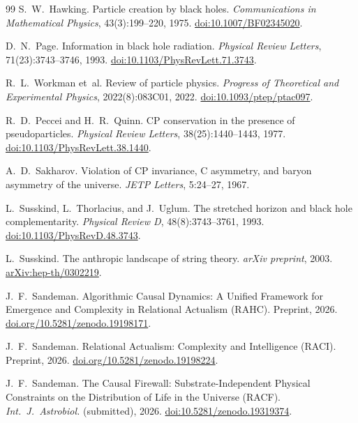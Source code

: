 \documentclass[11pt,a4paper]{article}
\begin{document}
\begin{thebibliography}{99}
S.~W.~Hawking.
\newblock Particle creation by black holes.
\newblock \emph{Communications in Mathematical Physics}, 43(3):199--220, 1975.
\newblock \href{https://doi.org/10.1007/BF02345020}{doi:10.1007/BF02345020}.

D.~N.~Page.
\newblock Information in black hole radiation.
\newblock \emph{Physical Review Letters}, 71(23):3743--3746, 1993.
\newblock \href{https://doi.org/10.1103/PhysRevLett.71.3743}{doi:10.1103/PhysRevLett.71.3743}.

R.~L.~Workman et~al.
\newblock Review of particle physics.
\newblock \emph{Progress of Theoretical and Experimental Physics},
  2022(8):083C01, 2022.
\newblock \href{https://doi.org/10.1093/ptep/ptac097}{doi:10.1093/ptep/ptac097}.

R.~D.~Peccei and H.~R.~Quinn.
\newblock CP conservation in the presence of pseudoparticles.
\newblock \emph{Physical Review Letters}, 38(25):1440--1443, 1977.
\newblock \href{https://doi.org/10.1103/PhysRevLett.38.1440}{doi:10.1103/PhysRevLett.38.1440}.

A.~D.~Sakharov.
\newblock Violation of CP invariance, C asymmetry, and baryon asymmetry of the universe.
\newblock \emph{JETP Letters}, 5:24--27, 1967.

L.~Susskind, L.~Thorlacius, and J.~Uglum.
\newblock The stretched horizon and black hole complementarity.
\newblock \emph{Physical Review D}, 48(8):3743--3761, 1993.
\newblock \href{https://doi.org/10.1103/PhysRevD.48.3743}{doi:10.1103/PhysRevD.48.3743}.

L.~Susskind.
\newblock The anthropic landscape of string theory.
\newblock \emph{arXiv preprint}, 2003.
\newblock \href{https://arxiv.org/abs/hep-th/0302219}{arXiv:hep-th/0302219}.

J.~F.~Sandeman.
\newblock Algorithmic Causal Dynamics: A Unified Framework for Emergence
  and Complexity in Relational Actualism ({RAHC}).
\newblock Preprint, 2026.
\newblock \href{https://doi.org/10.5281/zenodo.19198171}{doi.org/10.5281/zenodo.19198171}.

J.~F.~Sandeman.
\newblock Relational Actualism: Complexity and Intelligence ({RACI}).
\newblock Preprint, 2026.
\newblock \href{https://doi.org/10.5281/zenodo.19198224}{doi.org/10.5281/zenodo.19198224}.


J.~F.~Sandeman.
\newblock The Causal Firewall: Substrate-Independent Physical Constraints
  on the Distribution of Life in the Universe (RACF).
\newblock \textit{Int.\ J.\ Astrobiol.} (submitted), 2026.
\newblock \href{https://doi.org/10.5281/zenodo.19319374}%
  {doi:10.5281/zenodo.19319374}.

\end{thebibliography}
\end{document}
